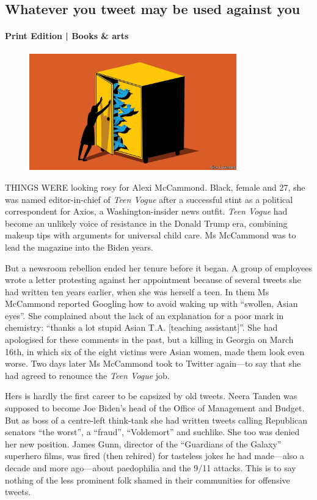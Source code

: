 \documentclass{article}
\begin{document}
\subsection{Whatever you tweet may be used against you }
\paragraph{Print Edition | Books \& arts  \quad \color{gray}{Mar 27th 2021 }}
\begin{figure}[h]
\centering
\includegraphics[width=0.8\textwidth]{images/20210327_BKD001_0.jpg}
\end{figure}
\lettrine{T}HINGS WERE looking rosy for Alexi McCammond. Black, female and 27, she was named editor-in-chief of \emph{Teen Vogue} after a successful stint as a political correspondent for Axios, a Washington-insider news outfit. \emph{Teen Vogue} had become an unlikely voice of resistance in the Donald Trump era, combining makeup tips with arguments for universal child care. Ms McCammond was to lead the magazine into the Biden years. 

But a newsroom rebellion ended her tenure before it began. A group of employees wrote a letter protesting against her appointment because of several tweets she had written ten years earlier, when she was herself a teen. In them Ms McCammond reported Googling how to avoid waking up with ``swollen, Asian eyes''. She complained about the lack of an explanation for a poor mark in chemistry: ``thanks a lot stupid Asian T.A. {[}teaching assistant{]}''. She had apologised for these comments in the past, but a killing in Georgia on March 16th, in which six of the eight victims were Asian women, made them look even worse. Two days later Ms McCammond took to Twitter again---to say that she had agreed to renounce the \emph{Teen Vogue} job. 

Hers is hardly the first career to be capsized by old tweets. Neera Tanden was supposed to become Joe Biden's head of the Office of Management and Budget. But as boss of a centre-left think-tank she had written tweets calling Republican senators ``the worst'', a ``fraud'', ``Voldemort'' and suchlike. She too was denied her new position. James Gunn, director of the ``Guardians of the Galaxy'' superhero films, was fired (then rehired) for tasteless jokes he had made---also a decade and more ago---about paedophilia and the 9/11 attacks. This is to say nothing of the less prominent folk shamed in their communities for offensive tweets. 
\end{document}
